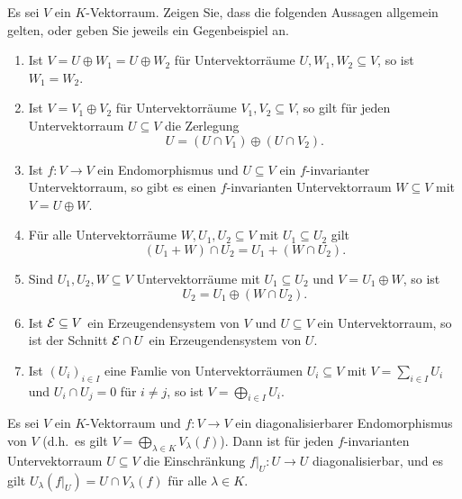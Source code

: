 \begin{question}
  Es sei $V$ ein $K$-Vektorraum.
  Zeigen Sie, dass die folgenden Aussagen allgemein gelten, oder geben Sie jeweils ein Gegenbeispiel an.
  \begin{enumerate}[leftmargin=*]
    \item
      Ist $V = U \oplus W_1 = U \oplus W_2$ für Untervektorräume $U, W_1, W_2 \subseteq V$, so ist $W_1 = W_2$.
    \item
      Ist $V = V_1 \oplus V_2$ für Untervektorräume $V_1, V_2 \subseteq V$, so gilt für jeden Untervektorraum $U \subseteq V$ die Zerlegung
      \[
        U = (U \cap V_1) \oplus (U \cap V_2).
      \]
    \item
      Ist $f \colon V \to V$ ein Endomorphismus und $U \subseteq V$ ein $f$-invarianter Untervektorraum, so gibt es einen $f$-invarianten Untervektorraum $W \subseteq V$ mit $V = U \oplus W$.
    \item
      Für alle Untervektorräume $W, U_1, U_2 \subseteq V$ mit $U_1 \subseteq U_2$ gilt
      \[
        (U_1 + W) \cap U_2 =  U_1 + (W \cap U_2).
      \]
    \item
      Sind $U_1, U_2, W \subseteq V$ Untervektorräume mit $U_1 \subseteq U_2$ und $V = U_1 \oplus W$, so ist
      \[
        U_2 = U_1 \oplus (W \cap U_2).
      \]
    \item
      Ist $\mathcal{E} \subseteq V$ ein Erzeugendensystem von $V$ und $U \subseteq V$ ein Untervektorraum, so ist der Schnitt $\mathcal{E} \cap U$ ein Erzeugendensystem von $U$.
    \item
      Ist $(U_i)_{i \in I}$ eine Famlie von Untervektorräumen $U_i \subseteq V$ mit $V = \sum_{i \in I} U_i$ und $U_i \cap U_j = 0$ für $i \neq j$, so ist $V = \bigoplus_{i \in I} U_i$.
  \end{enumerate}
\end{question}


\begin{question}
  Es sei $V$ ein $K$-Vektorraum und $f \colon V \to V$ ein diagonalisierbarer Endomorphismus von $V$ (d.h.\ es gilt \mbox{$V = \bigoplus_{\lambda \in K} V_\lambda(f)$}).
  Dann ist für jeden $f$-invarianten Untervektorraum $U \subseteq V$ die Einschränkung $f|_U \colon U \to U$ diagonalisierbar, und es gilt $U_\lambda(f|_U) = U \cap V_\lambda(f)$ für alle $\lambda \in K$.
\end{question}



